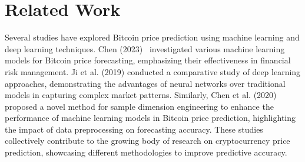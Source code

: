 \section{Related Work}\label{sec:related_work}

Several studies have explored Bitcoin price prediction using machine learning and deep learning techniques.
Chen (2023)\ \cite{Chen2023} investigated various machine learning models for Bitcoin price forecasting,
emphasizing their effectiveness in financial risk management. Ji et al. (2019) conducted a comparative study
of deep learning approaches, demonstrating the advantages of neural networks over traditional models in capturing
complex market patterns. Similarly, Chen et al. (2020)\ \cite{Chen2020} proposed a novel method for sample
dimension engineering to enhance the performance of machine learning models in Bitcoin price prediction,
highlighting the impact of data preprocessing on forecasting accuracy. These studies collectively contribute
to the growing body of research on cryptocurrency price prediction, showcasing different methodologies to improve
predictive accuracy.
